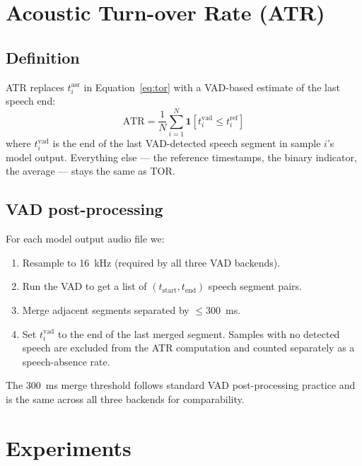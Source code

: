\documentclass[a4paper]{article}
\begin{document}
\section{Acoustic Turn-over Rate (ATR)}
\label{sec:atr}

\subsection{Definition}

ATR replaces $t^{\text{asr}}_i$ in Equation~\ref{eq:tor} with a VAD-based
estimate of the last speech end:
\begin{equation}
    \text{ATR} = \frac{1}{N} \sum_{i=1}^{N}
    \mathbf{1}\!\left[t^{\text{vad}}_i \leq t^{\text{ref}}_i\right]
    \label{eq:atr}
\end{equation}
where $t^{\text{vad}}_i$ is the end of the last VAD-detected speech segment
in sample $i$'s model output. Everything else --- the reference timestamps,
the binary indicator, the average --- stays the same as TOR.

\subsection{VAD post-processing}

For each model output audio file we:
\begin{enumerate}
    \item Resample to 16~kHz (required by all three VAD backends).
    \item Run the VAD to get a list of $(t_{\text{start}}, t_{\text{end}})$
          speech segment pairs.
    \item Merge adjacent segments separated by $\leq 300$~ms.
    \item Set $t^{\text{vad}}_i$ to the end of the last merged segment.
          Samples with no detected speech are excluded from the ATR computation
          and counted separately as a speech-absence rate.
\end{enumerate}

The 300~ms merge threshold follows standard VAD post-processing
practice and is the same across all three backends for comparability.

\section{Experiments}
\label{sec:experiments}
\end{document}
